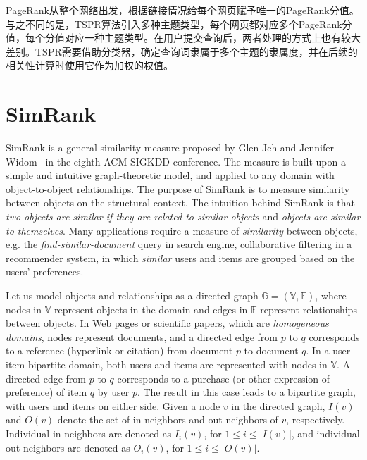 PageRank从整个网络出发，根据链接情况给每个网页赋予唯一的PageRank分值。与之不同的是，TSPR算法引入多种主题类型，每个网页都对应多个PageRank分值，每个分值对应一种主题类型。在用户提交查询后，两者处理的方式上也有较大差别。TSPR需要借助分类器，确定查询词隶属于多个主题的隶属度，并在后续的相关性计算时使用它作为加权的权值。


\section{SimRank}
SimRank is a general similarity measure proposed by Glen Jeh and Jennifer Widom~\cite{jeh2002simrank} in the eighth ACM SIGKDD conference. The measure is built upon a simple and intuitive graph-theoretic model, and applied to any domain with object-to-object relationships. The purpose of SimRank is to measure similarity between objects on the structural context. The intuition behind SimRank is that \textit{two objects are similar if they are related to similar objects} and \textit{objects are similar to themselves}. Many applications require a measure of \textit{similarity} between objects, e.g. the \textit{find-similar-document} query in search engine, collaborative filtering in a recommender system, in which \textit{similar} users and items are grouped based on the users' preferences.

Let us model objects and relationships as a directed graph $\mathbb G = (\mathbb V, \mathbb E)$, where nodes in $\mathbb V$ represent objects in the domain and edges in $\mathbb E$ represent relationships between objects. In Web pages or scientific papers, which are \textit{homogeneous domains}, nodes represent documents, and a directed edge from $p$ to $q$ corresponds to a reference (hyperlink or citation) from document $p$ to document $q$.
In a user-item bipartite domain, both users and items are represented with nodes in $\mathbb V$. A directed edge from $p$ to $q$ corresponds to a purchase (or other expression of preference) of item $q$ by user $p$. The result in this case leads to a bipartite graph, with users and items on either side. Given a node $v$ in the directed graph, $I(v)$ and $O(v)$ denote the set of in-neighbors and out-neighbors of $v$, respectively. Individual in-neighbors are denoted as $I_i(v)$, for $1 \le i \le |I(v)|$, and individual out-neighbors are denoted as $O_i(v)$, for $1\le i\le |O(v)|$.

